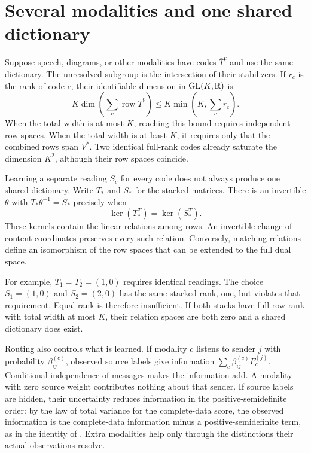 \section{Several modalities and one shared dictionary}

Suppose speech, diagrams, or other modalities have codes $\bar T^c$ and use the same dictionary. The unresolved subgroup is the intersection of their stabilizers. If $r_c$ is the rank of code $c$, their identifiable dimension in $\mathrm{GL}(K,\mathbb R)$ is
\begin{equation}
K\dim\left(\sum_c\operatorname{row}\bar T^c\right)
\leq K\min\left(K,\sum_c r_c\right).
\label{c17:modalities}
\end{equation}
When the total width is at most $K$, reaching this bound requires independent row spaces. When the total width is at least $K$, it requires only that the combined rows span $V^*$. Two identical full-rank codes already saturate the dimension $K^2$, although their row spaces coincide.

Learning a separate reading $S_c$ for every code does not always produce one shared dictionary. Write $T_*$ and $S_*$ for the stacked matrices. There is an invertible $\theta$ with $T_*\theta^{-1}=S_*$ precisely when
\begin{equation}
\ker(T_*^T)=\ker(S_*^T).
\label{c17:row-relations}
\end{equation}
These kernels contain the linear relations among rows. An invertible change of content coordinates preserves every such relation. Conversely, matching relations define an isomorphism of the row spaces that can be extended to the full dual space.

For example, $T_1=T_2=(1,0)$ requires identical readings. The choice $S_1=(1,0)$ and $S_2=(2,0)$ has the same stacked rank, one, but violates that requirement. Equal rank is therefore insufficient. If both stacks have full row rank with total width at most $K$, their relation spaces are both zero and a shared dictionary does exist.

Routing also controls what is learned. If modality $c$ listens to sender $j$ with probability $\beta_{ij}^{(c)}$, observed source labels give information $\sum_c\beta_{ij}^{(c)}F_c^{(j)}$. Conditional independence of messages makes the information add. A modality with zero source weight contributes nothing about that sender. If source labels are hidden, their uncertainty reduces information in the positive-semidefinite order: by the law of total variance for the complete-data score, the observed information is the complete-data information minus a positive-semidefinite term, as in the identity of \citet{Louis1982}. Extra modalities help only through the distinctions their actual observations resolve.

